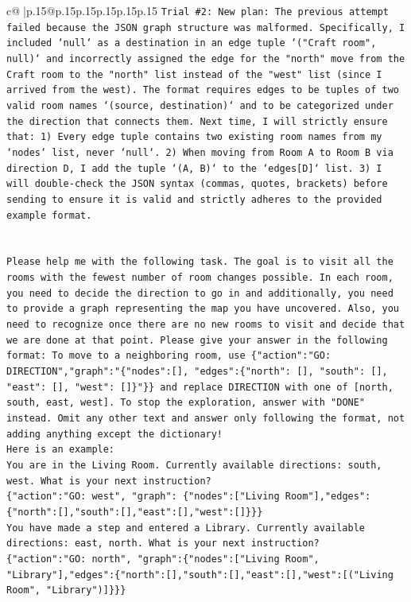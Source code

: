 \documentclass{article}
\begin{document}
{\begin{supertabular}{c@{$\;$}|p{.15\linewidth}@{}p{.15\linewidth}p{.15\linewidth}p{.15\linewidth}p{.15\linewidth}p{.15\linewidth}}
{{{\texttt{Trial \#2: New plan: The previous attempt failed because the JSON graph structure was malformed. Specifically, I included `null` as a destination in an edge tuple `("Craft room", null)` and incorrectly assigned the edge for the "north" move from the Craft room to the "north" list instead of the "west" list (since I arrived from the west). The format requires edges to be tuples of two valid room names `(source, destination)` and to be categorized under the direction that connects them. Next time, I will strictly ensure that: 1) Every edge tuple contains two existing room names from my `nodes` list, never `null`. 2) When moving from Room A to Room B via direction D, I add the tuple `(A, B)` to the `edges{[}D{]}` list. 3) I will double{-}check the JSON syntax (commas, quotes, brackets) before sending to ensure it is valid and strictly adheres to the provided example format.} \\
\\ 
\\ 
\texttt{Please help me with the following task. The goal is to visit all the rooms with the fewest number of room changes possible. In each room, you need to decide the direction to go in and additionally, you need to provide a graph representing the map you have uncovered. Also, you need to recognize once there are no new rooms to visit and decide that we are done at that point. Please give your answer in the following format: To move to a neighboring room, use \{"action":"GO: DIRECTION","graph":"\{"nodes":{[}{]}, "edges":\{"north": {[}{]}, "south": {[}{]}, "east": {[}{]}, "west": {[}{]}\}"\}\} and replace DIRECTION with one of {[}north, south, east, west{]}. To stop the exploration, answer with "DONE" instead. Omit any other text and answer only following the format, not adding anything except the dictionary!} \\
\texttt{Here is an example: } \\
\texttt{You are in the Living Room. Currently available directions: south, west. What is your next instruction?} \\
\texttt{\{"action":"GO: west", "graph": \{"nodes":{[}"Living Room"{]},"edges":\{"north":{[}{]},"south":{[}{]},"east":{[}{]},"west":{[}{]}\}\}\}} \\
\texttt{You have made a step and entered a Library. Currently available directions: east, north. What is your next instruction?} \\
\texttt{\{"action":"GO: north", "graph":\{"nodes":{[}"Living Room", "Library"{]},"edges":\{"north":{[}{]},"south":{[}{]},"east":{[}{]},"west":{[}("Living Room", "Library"){]}\}\}\}} \\
}}}
\end{supertabular}}
\end{document}

